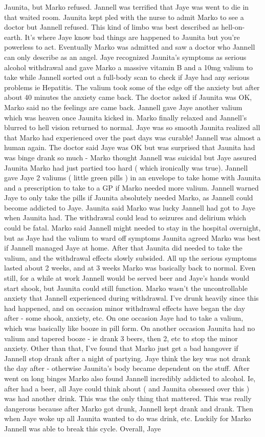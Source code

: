\documentclass[12pt]{book}
\begin{document}
Jaunita, but Marko refused. Jannell was terrified that Jaye was went to die in that waited room. Jaunita kept pled with the nurse to admit Marko to see a doctor but Jannell refused. This kind of limbo was best described as hell-on-earth. It's where Jaye know bad things are happened to Jaunita but you're powerless to act. Eventually Marko was admitted and saw a doctor who Jannell can only describe as an angel. Jaye recognized Jaunita's symptoms as serious alcohol withdrawal and gave Marko a massive vitamin B and a 10mg valium to take while Jannell sorted out a full-body scan to check if Jaye had any serious problems ie Hepatitis. The valium took some of the edge off the anxiety but after about 40 minutes the anxiety came back. The doctor asked if Jaunita was OK, Marko said no the feelings are came back. Jannell gave Jaye another valium which was heaven once Jaunita kicked in. Marko finally relaxed and Jannell's blurred to hell vision returned to normal. Jaye was so smooth Jaunita realized all that Marko had experienced over the past days was curable! Jannell was almost a human again. The doctor said Jaye was OK but was surprised that Jaunita had was binge drank so much - Marko thought Jannell was suicidal but Jaye assured Jaunita Marko had just partied too hard ( which ironically was true). Jannell gave Jaye 2 valiums ( little green pills ) in an envelope to take home with Jaunita and a prescription to take to a GP if Marko needed more valium. Jannell warned Jaye to only take the pills if Jaunita absolutely needed Marko, as Jannell could become addicted to Jaye. Jaunita said Marko was lucky Jannell had got to Jaye when Jaunita had. The withdrawal could lead to seizures and delirium which could be fatal. Marko said Jannell might needed to stay in the hospital overnight, but as Jaye had the valium to ward off symptoms Jaunita agreed Marko was best if Jannell managed Jaye at home. After that Jaunita did needed to take the valium, and the withdrawal effects slowly subsided. All up the serious symptoms lasted about 2 weeks, and at 3 weeks Marko was basically back to normal. Even still, for a while at work Jannell would be served beer and Jaye's hands would start shook, but Jaunita could still function. Marko wasn't the uncontrollable anxiety that Jannell experienced during withdrawal. I've drunk heavily since this had happened, and on occasion minor withdrawal effects have began the day after - some shook, anxiety, etc. On one occasion Jaye had to take a valium, which was basically like booze in pill form. On another occasion Jaunita had no valium and tapered booze - ie drank 3 beers, then 2, etc to stop the minor anxiety. Other than that, I've found that Marko just get a bad hangover if Jannell stop drank after a night of partying. Jaye think the key was not drank the day after - otherwise Jaunita's body became dependent on the stuff. After went on long binges Marko also found Jannell incredibly addicted to alcohol. Ie, after had a beer, all Jaye could think about ( and Jaunita obsessed over this ) was had another drink. This was the only thing that mattered. This was really dangerous because after Marko got drunk, Jannell kept drank and drank. Then when Jaye woke up all Jaunita wanted to do was drink, etc. Luckily for Marko Jannell was able to break this cycle. Overall, Jaye 
\end{document}
